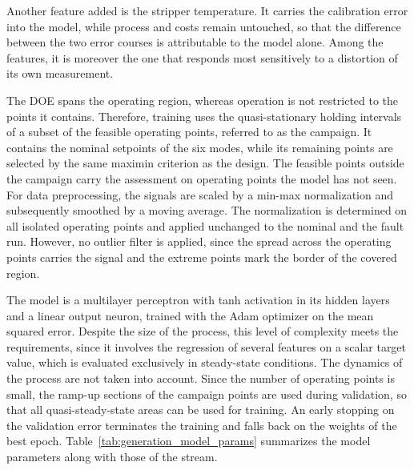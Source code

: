 %
Another feature added is the stripper temperature. It carries the calibration error into the model, while process and costs remain untouched, so that the difference between the two error courses is attributable to the model alone. Among the features, it is moreover the one that responds most sensitively to a distortion of its own measurement. \par
%
The DOE spans the operating region, whereas operation is not restricted to the points it contains. Therefore, training uses the quasi-stationary holding intervals of a subset of the feasible operating points, referred to as the campaign. It contains the nominal setpoints of the six modes, while its remaining points are selected by the same maximin criterion as the design. The feasible points outside the campaign carry the assessment on operating points the model has not seen. 
For data preprocessing, the signals are scaled by a min-max normalization and subsequently smoothed by a moving average. The normalization is determined on all isolated operating points and applied unchanged to the nominal and the fault run. However, no outlier filter is applied, since the spread across the operating points carries the signal and the extreme points mark the border of the covered region. \par
%
The model is a multilayer perceptron with tanh activation in its hidden layers and a linear output neuron, trained with the Adam optimizer on the mean squared error. Despite the size of the process, this level of complexity meets the requirements, since it involves the regression of several features on a scalar target value, which is evaluated exclusively in steady-state conditions. The dynamics of the process are not taken into account.
Since the number of operating points is small, the ramp-up sections of the campaign points are used during validation, so that all quasi-steady-state areas can be used for training. An early stopping on the validation error terminates the training and falls back on the weights of the best epoch. Table~\ref{tab:generation_model_params} summarizes the model parameters along with those of the stream. \par
%

